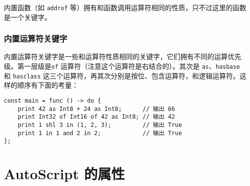 内置函数（如 \lstinline!addrof! 等）拥有和函数调用运算符相同的性质，只不过这里的函数是一个关键字。

\subsection{内置运算符关键字}

内置运算符关键字是一些和运算符性质相同的关键字，它们拥有不同的运算优先级。第一层级是\lstinline!of! 运算符（注意这个运算符是右结合的）。其次是 \lstinline!as!、\lstinline!hasbase! 和 \lstinline!hasclass! 这三个运算符，再其次分别是按位、包含运算符，和逻辑运算符。这样的顺序有下面的考量：

\begin{lstlisting}
const main = func () -> do {
    print 42 as Int8 + 24 as Int8;      // 输出 66
    print Int32 of Int16 of 42 as Int8; // 输出 42
    print 1 shl 3 in (1, 2, 3);         // 输出 True
    print 1 in 1 and 2 in 2;            // 输出 True
};
\end{lstlisting}




\chapter{AutoScript 的属性}

